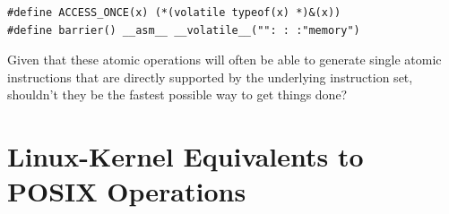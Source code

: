 \vspace{5pt}
\begin{minipage}[t]{\columnwidth}
{
\scriptsize
\begin{verbatim}
#define ACCESS_ONCE(x) (*(volatile typeof(x) *)&(x))
#define barrier() __asm__ __volatile__("": : :"memory")
\end{verbatim}
}
\end{minipage}
\vspace{5pt}

\QuickQuiz{}
	Given that these atomic operations will often be able to
	generate single atomic instructions that are directly
	supported by the underlying instruction set, shouldn't
	they be the fastest possible way to get things done?
 \QuickQuizEnd

\section{Linux-Kernel Equivalents to POSIX Operations}
\label{sec:toolsoftrade:Linux-Kernel Equivalents to POSIX Operations}

